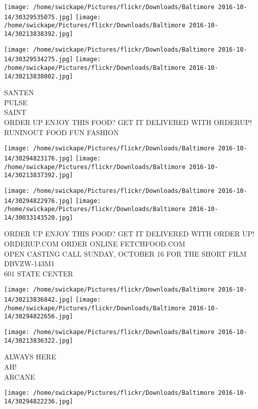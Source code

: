 \documentclass[10pt,letterpaper]{article}
\begin{document}
\texttt{[image: /home/swickape/Pictures/flickr/Downloads/Baltimore 2016-10-14/30329535075.jpg]}
\texttt{[image: /home/swickape/Pictures/flickr/Downloads/Baltimore 2016-10-14/30213838392.jpg]}

\texttt{[image: /home/swickape/Pictures/flickr/Downloads/Baltimore 2016-10-14/30329534275.jpg]}
\texttt{[image: /home/swickape/Pictures/flickr/Downloads/Baltimore 2016-10-14/30213838002.jpg]}

SANTEN\\
PULSE\\
SAINT\\
ORDER UP ENJOY THIS FOOD?  GET IT DELIVERED WITH ORDERUP!  RUNINOUT FOOD FUN FASHION\\
\pagebreak

\texttt{[image: /home/swickape/Pictures/flickr/Downloads/Baltimore 2016-10-14/30294823176.jpg]}
\texttt{[image: /home/swickape/Pictures/flickr/Downloads/Baltimore 2016-10-14/30213837392.jpg]}

\texttt{[image: /home/swickape/Pictures/flickr/Downloads/Baltimore 2016-10-14/30294822976.jpg]}
\texttt{[image: /home/swickape/Pictures/flickr/Downloads/Baltimore 2016-10-14/30033143520.jpg]}

ORDER UP ENJOY THIS FOOD?  GET IT DELIVERED WITH ORDER UP!  ORDERUP.COM  ORDER ONLINE FETCHFOOD.COM\\
OPEN CASTING CALL SUNDAY, OCTOBER 16 FOR THE SHORT FILM\\
DBVZW{-}143M1\\
601 STATE CENTER\\
\pagebreak

\texttt{[image: /home/swickape/Pictures/flickr/Downloads/Baltimore 2016-10-14/30213836842.jpg]}
\texttt{[image: /home/swickape/Pictures/flickr/Downloads/Baltimore 2016-10-14/30294822656.jpg]}

\vspace{0.25in}
\texttt{[image: /home/swickape/Pictures/flickr/Downloads/Baltimore 2016-10-14/30213836322.jpg]}

ALWAYS HERE\\
AH!\\
ARCANE\\
\pagebreak

\texttt{[image: /home/swickape/Pictures/flickr/Downloads/Baltimore 2016-10-14/30294822236.jpg]}
\end{document}
